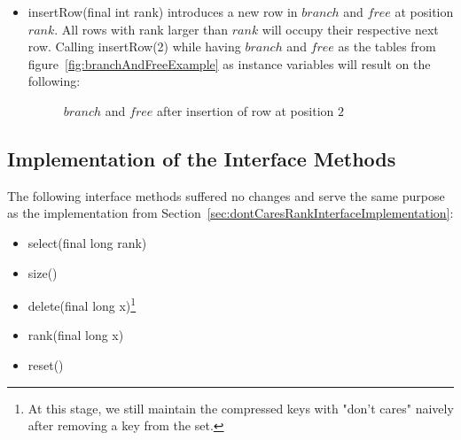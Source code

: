 \begin{itemize}
    \item
    {\ttfamily insertRow(final int rank)} introduces a new row in $branch$ and $free$ at position $rank$. All rows with rank larger than $rank$ will occupy their respective next row. Calling {\ttfamily insertRow(2)} while having $branch$ and $free$ as the tables from figure~\ref{fig:branchAndFreeExample} as instance variables will result on the following:
    \begin{figure}[H]
    \centering
    
    \caption[Example of $branch$ and $free$ after insertion of row at position $2$]{$branch$ and $free$ after insertion of row at position $2$}
    \label{fig:branchAndFreeAfterRowInsertion}
    \end{figure}
\end{itemize}

\subsection{Implementation of the Interface Methods}  \label{sec:dontCaresInsertInterfaceImplementation}

The following interface methods suffered no changes and serve the same purpose as the implementation from Section~\ref{sec:dontCaresRankInterfaceImplementation}:
\begin{itemize}
    \item
    {\ttfamily select(final long rank)}
    
    \item
    {\ttfamily size()}
    
    \item
    {\ttfamily delete(final long x)}\footnote{At this stage, we still maintain the compressed keys with "don't cares" naively after removing a key from the set.}
    
    \item
    {\ttfamily rank(final long x)}
    
    \item
    {\ttfamily reset()}
\end{itemize}

